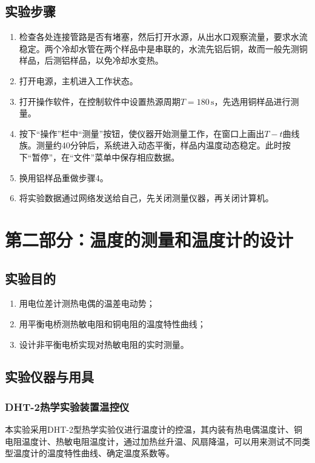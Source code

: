 \documentclass[UTF8]{article}
\theoremstyle{MyLineTheoremStyle} %
\theoremstyle{MyBlockTheoremStyle} %
\theoremstyle{MySubsubsectionStyle} %
\begin{document}
\subsection{实验步骤}
\begin{enumerate}
\item 检查各处连接管路是否有堵塞，然后打开水源，从出水口观察流量，要求水流稳定。两个冷却水管在两个样品中是串联的，水流先铝后铜，故而一般先测铜样品，后测铝样品，以免冷却水变热。
\item 打开电源，主机进入工作状态。
\item 打开操作软件，在控制软件中设置热源周期$ T=180\,\mathrm s $，先选用铜样品进行测量。
\item 按下“操作”栏中“测量”按钮，使仪器开始测量工作，在窗口上画出$ T-t $曲线族。测量约40分钟后，系统进入动态平衡，样品内温度动态稳定。此时按下“暂停”，在“文件”菜单中保存相应数据。
\item 换用铝样品重做步骤4。
\item 将实验数据通过网络发送给自己，先关闭测量仪器，再关闭计算机。

\end{enumerate}

\section{第二部分：温度的测量和温度计的设计}

\subsection{实验目的}
\begin{enumerate}
\item 用电位差计测热电偶的温差电动势；
\item 用平衡电桥测热敏电阻和铜电阻的温度特性曲线；
\item 设计非平衡电桥实现对热敏电阻的实时测量。
\end{enumerate}


\subsection{实验仪器与用具}
\subsubsection{DHT-2热学实验装置温控仪}
本实验采用DHT-2型热学实验仪进行温度计的控温，其内装有热电偶温度计、铜电阻温度计、热敏电阻温度计，通过加热丝升温、风扇降温，可以用来测试不同类型温度计的温度特性曲线、确定温度系数等。
\end{document}

